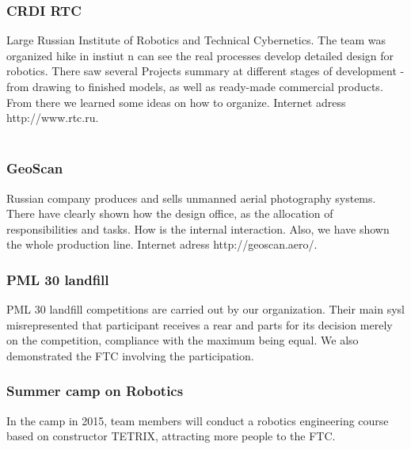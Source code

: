	\subsubsection{CRDI RTC}
		Large Russian Institute of Robotics and Technical Cybernetics. The team was organized hike in instiut n can see the real processes develop detailed design for robotics. There saw several Projects summary at different stages of development - from drawing to finished models, as well as ready-made commercial products. From there we learned some ideas on how to organize. Internet adress http://www.rtc.ru.	\\
		\\
	\subsubsection{GeoScan}
		Russian company produces and sells unmanned aerial photography systems. There have clearly shown how the design office, as the allocation of responsibilities and tasks. How is the internal interaction. Also, we have shown the whole production line. Internet adress http://geoscan.aero/.	
		\\
	\subsubsection{PML 30 landfill}	
		PML 30 landfill competitions are carried out by our organization. Their main sysl misrepresented that participant receives a rear and parts for its decision merely on the competition, compliance with the maximum being equal. We also demonstrated the FTC involving the participation.
		\\
	\subsubsection{Summer camp on Robotics}
	In the camp in 2015, team members will conduct a robotics engineering course based on constructor TETRIX, attracting more people to the FTC.
		
		
		
		
		
		
		
		
		
